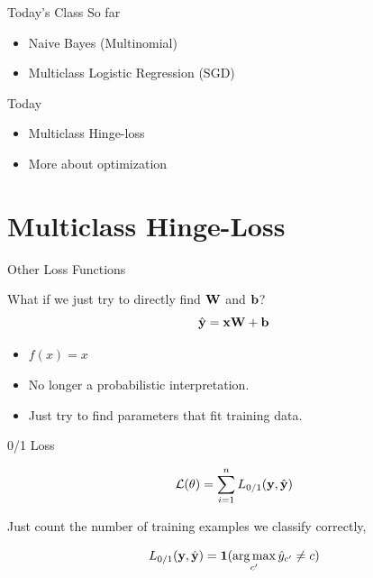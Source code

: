 \documentclass{beamer}
\begin{document}
\begin{frame}{Today's Class}
  So far
  \begin{itemize}
  \item Naive Bayes (Multinomial)
  \item Multiclass Logistic Regression (SGD)
  \end{itemize}

  Today

  \begin{itemize}
  \item Multiclass Hinge-loss
  \item More about optimization
  \end{itemize}
\end{frame}


\section{Multiclass Hinge-Loss}

\begin{frame}{Other Loss Functions}
  
  What if we just try to directly find $\mathbf{W}$ and $\mathbf{b}$? 
     \[\hat{\mathbf{y}} = \mathbf{x} \mathbf{W} + \mathbf{b}\]   
     
     \begin{itemize}
     \item $f(x) = x$ 
     \item No longer a probabilistic interpretation.
     \item Just try to find parameters that fit training data.
     \end{itemize}

\end{frame}

\begin{frame}{0/1 Loss}
  
  \[{\mathcal{L}(\theta)} = \sum_{i=1}^n L_{0/1}(\mathbf{y}, \hat{\mathbf{y}}) \] 

  Just count the number of training examples we classify correctly,

  \[ L_{0/1}(\boldy, \hat{\boldy}) =  \indicator(\argmax_{c'} \hat{y}_{c'} \neq c)   \]
\end{frame}
\end{document}

